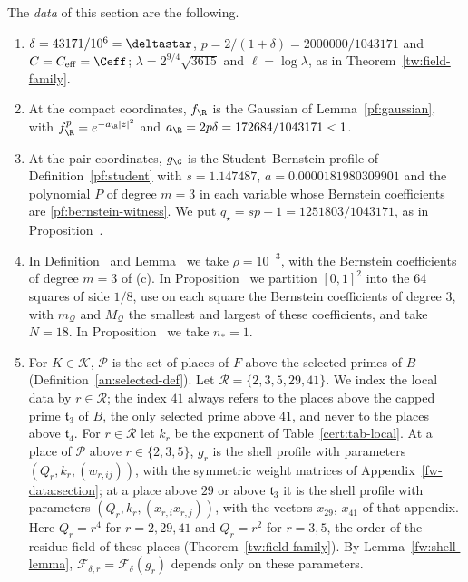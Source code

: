 \begin{definition}\label{cert:data}
The \emph{data} of this section are the following.
\begin{enumerate}
\item[(a)] $\delta=43171/10^6=\deltastar$, $p=2/(1+\delta)=2000000/1043171$
 and $C=C_{\rm eff}=\Ceff$; $\lambda=2^{9/4}\sqrt{3615}$ and $\ell=\log\lambda$,
 as in Theorem~\ref{tw:field-family}.
\item[(b)] At the compact coordinates, $f_\R$ is the Gaussian of
 Lemma~\ref{pf:gaussian}, with $f_\R^p=e^{-a_\R|z|^2}$ and
 $a_\R=2p\delta=172684/1043171<1$.
\item[(c)] At the pair coordinates, $g_\C$ is the Student--Bernstein
 profile of Definition~\ref{pf:student} with $s=1.147487$,
 $a=0.0000181980309901$ and the polynomial $P$ of degree $m=3$ in each
 variable whose Bernstein coefficients are \eqref{pf:bernstein-witness}. We
 put $q_\star=sp-1=1251803/1043171$, as in Proposition~.
\item[(d)] In Definition~ and Lemma~ we take
 $\rho=10^{-3}$, with the Bernstein coefficients of degree $m=3$ of (c). In
 Proposition~ we partition $[0,1]^2$ into the $64$ squares of
 side $1/8$, use on each square the Bernstein coefficients of degree $3$, with
 $m_{\mathcal Q}$ and $M_{\mathcal Q}$ the smallest and largest of these
 coefficients, and take $N=18$. In Proposition~ we take
 $n_*=1$.
\item[(e)] For $K\in\mathcal K$, $\mathcal P$ is the set of places of $F$
 above the selected primes of $B$ (Definition~\ref{an:selected-def}). Let
 $\mathcal R=\{2,3,5,29,41\}$. We index the local data by $r\in\mathcal R$;
 the index $41$ always refers to the places above the capped prime
 $\mathfrak t_3$ of $B$, the only selected prime above $41$, and never to the
 places above $\mathfrak t_4$. For $r\in\mathcal R$ let $k_r$ be the
 exponent of Table~\ref{cert:tab-local}. At a place of $\mathcal P$ above
 $r\in\{2,3,5\}$, $g_r$ is the shell profile with parameters
 $(Q_r,k_r,(w_{r,ij}))$, with the symmetric weight matrices of
 Appendix~\ref{fw-data:section}; at a place above $29$ or above
 $\mathfrak t_3$ it is the shell profile with parameters
 $(Q_r,k_r,(x_{r,i}x_{r,j}))$, with the vectors $x_{29}$, $x_{41}$ of that
 appendix. Here $Q_r=r^4$ for $r=2,29,41$ and $Q_r=r^2$ for $r=3,5$, the
 order of the residue field of these places (Theorem~\ref{tw:field-family}).
 By Lemma~\ref{fw:shell-lemma}, $\mathcal F_{\delta,r}=\mathcal F_\delta(g_r)$
 depends only on these parameters.
\end{enumerate}
\end{definition}

